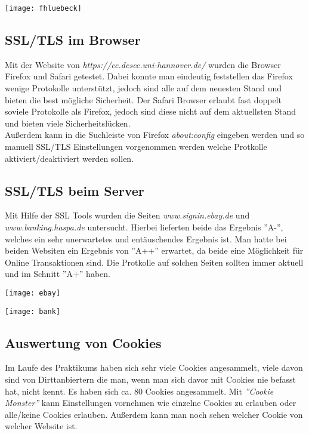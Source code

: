 \documentclass{scrartcl}
\begin{document}
  \texttt{[image: fhluebeck]}
  \label{fig:fhluebeck}
  
  \subsection[Aufgabe 8 SSL/TLS im Browser]{SSL/TLS im Browser}
  
  Mit der Website von \emph{\textit{https://cc.dcsec.uni-hannover.de/}} wurden die Browser Firefox und Safari getestet. 
  Dabei konnte man eindeutig feststellen das Firefox wenige Protokolle unterstützt, jedoch sind alle auf dem neuesten Stand und bieten die best mögliche Sicherheit.
  Der Safari Browser erlaubt fast doppelt soviele Protokolle als Firefox, jedoch sind diese nicht auf dem aktuellsten Stand und bieten viele Sicherheitslücken.\\
  Außerdem kann in die Suchleiste von Firefox \textit{about:config} eingeben werden und so manuell SSL/TLS Einstellungen vorgenommen werden welche Protkolle aktiviert/deaktiviert werden sollen.
  
  \subsection[Aufgabe 9 SSL/TLS beim Server]{SSL/TLS beim Server}
  
  Mit Hilfe der SSL Tools wurden die Seiten \emph{\textit{www.signin.ebay.de}} und \emph{\textit{www.banking.haspa.de}} untersucht. Hierbei lieferten beide das Ergebnis ''A-'', welches ein sehr unerwartetes und entäuschendes Ergebnis ist.
  Man hatte bei beiden Websiten ein Ergebnis von ''A++'' erwartet, da beide eine Möglichkeit für Online Transaktionen sind. Die Protkolle auf solchen Seiten sollten immer aktuell und im Schnitt ''A+'' haben.
  
  \texttt{[image: ebay]}
  \label{fig : ebay}
  
  \texttt{[image: bank]}
  \label{fig:bank}
  
  \subsection[Aufgabe 10 Auswertung von Cookies]{Auswertung von Cookies}
  
  Im Laufe des Praktikums haben sich sehr viele Cookies angesammelt, viele davon sind von Dirttanbiertern die man, wenn man sich davor mit Cookies nie befasst hat, nicht kennt. Es haben sich ca. 80 Cookies angesammelt. 
  Mit \textit{''Cookie Monster''} kann Einstellungen vornehmen wie einzelne Cookies zu erlauben oder alle/keine Cookies erlauben. Außerdem kann man noch sehen welcher Cookie von welcher Website ist.
  
\end{document}
